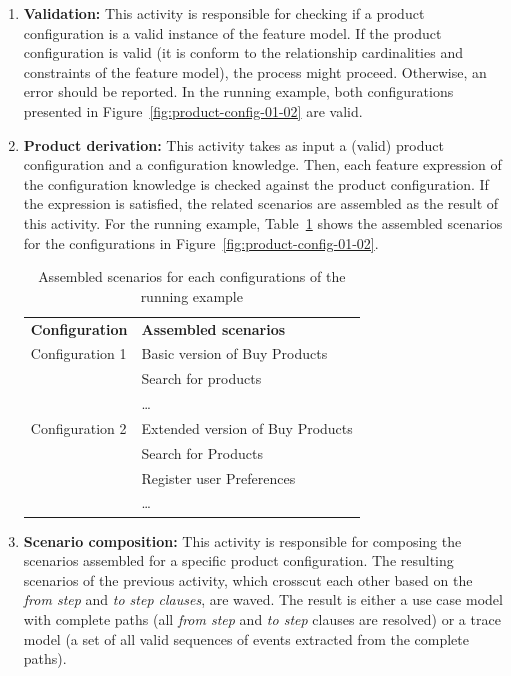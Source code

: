 \begin{enumerate}
\item {\bf Validation:} This activity is responsible for checking if a product configuration is a valid instance of the feature model. If the product configuration is 
valid (it is conform to the relationship cardinalities and constraints of the feature model), the process might proceed. Otherwise, an error should be reported. In the running example, both configurations presented in Figure~\ref{fig:product-config-01-02} are valid. 

\item {\bf Product derivation:} This activity takes as input a (valid) product configuration and a configuration knowledge. Then, each feature expression of the 
configuration knowledge is checked against the product configuration. If the expression is satisfied, the related scenarios are assembled as the result of 
this activity. For the running example, Table~\ref{tab:assembled-scenarios} shows the assembled scenarios for the configurations in  
Figure~\ref{fig:product-config-01-02}.

\begin{table}[h]
\begin{center}
\caption{Assembled scenarios for each configurations of the running example} \label{tab:assembled-scenarios}
\begin{tabular}{ll}
   \hline\noalign{\smallskip}
  {\bf Configuration} & {\bf Assembled scenarios} \\
   \noalign{\smallskip}
   \hline
   \noalign{\smallskip}
    Configuration 1\hspace{15pt} & Basic version of Buy Products \\
                             & Search for products \\
                             & \ldots \\
   Configuration 2 & Extended version of Buy Products \\
                             & Search for Products	 \\
                             & Register user Preferences \\
                             & \ldots       \\
  \hline
\end{tabular}
\end{center}
\end{table}
 
 \item {\bf Scenario composition:} This activity is responsible for composing the scenarios assembled for a specific product configuration. 
 The resulting scenarios of the previous activity, which crosscut each other based on the \emph{from step} and \emph{to step clauses}, are waved. The 
 result is either a use case model with complete paths (all \emph{from step} and \emph{to step} clauses are resolved) or a trace model (a set of all valid sequences of events extracted from the complete paths). 
 

\end{enumerate}

